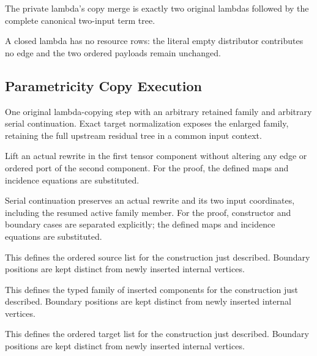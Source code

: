 The private lambda's copy merge is exactly two original lambdas followed by the complete canonical two-input term tree.
\par{}

A closed lambda has no resource rows: the literal empty distributor contributes no edge and the two ordered payloads remain unchanged.
\par{}

\subsection{Parametricity Copy Execution}
One original lambda-copying step with an arbitrary retained family and arbitrary serial continuation. Exact target normalization exposes the enlarged family, retaining the full upstream residual tree in a common input context.

Lift an actual rewrite in the first tensor component without altering any edge or ordered port of the second component.
For the proof, the defined maps and incidence equations are substituted.
\par{}

Serial continuation preserves an actual rewrite and its two input coordinates, including the resumed active family member.
For the proof, constructor and boundary cases are separated explicitly; the defined maps and incidence equations are substituted.
\par{}

This defines the ordered source list for the construction just described. Boundary positions are kept distinct from newly inserted internal vertices.
\par{}

This defines the typed family of inserted components for the construction just described. Boundary positions are kept distinct from newly inserted internal vertices.
\par{}

This defines the ordered target list for the construction just described. Boundary positions are kept distinct from newly inserted internal vertices.
\par{}

